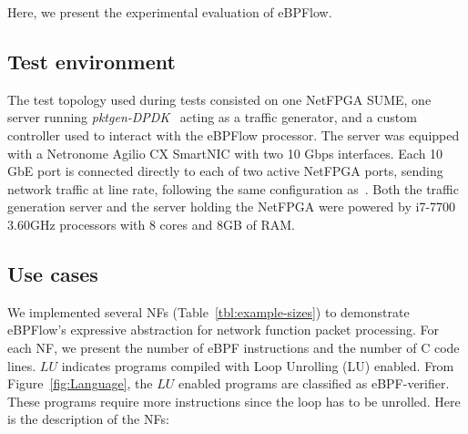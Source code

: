 
Here, we present the experimental evaluation of eBPFlow. 

\subsection{Test environment} 
\label{sec:experiments}



The test topology used during tests consisted on one NetFPGA SUME, one server running \textit{pktgen-DPDK}~\cite{Pktgen2016} acting as a traffic generator, and a custom controller used to interact with the eBPFlow processor. The server was equipped with a Netronome Agilio CX SmartNIC with two 10 Gbps interfaces. Each 10 GbE port is connected directly to each of two active NetFPGA ports, sending network traffic at line rate, following the same configuration as~\cite{FlowBlaze2019}. Both the traffic generation server and the server holding the NetFPGA were powered by i7-7700 \@ 3.60GHz processors with 8 cores and 8GB of RAM.



\subsection{Use cases}
\label{sec:use-cases}

We implemented several NFs (Table~\ref{tbl:example-sizes}) to demonstrate eBPFlow's expressive abstraction for network function packet processing. For each NF, we present the number of eBPF instructions and the number of C code lines. 
$LU$ indicates programs compiled with Loop Unrolling (LU) enabled. From Figure~\ref{fig:Language}, the $LU$ enabled programs are classified as eBPF-verifier. These programs require more instructions since the loop has to be unrolled. Here is the description of the NFs:

